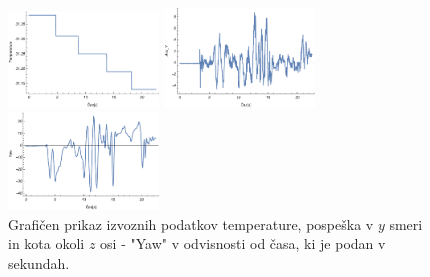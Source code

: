 \begin{figure}[!htbp]
	\begin{minipage}{3.5cm}
		\centering \includegraphics[width=4cm]{Vaje/ManevrZMems/figs/temp.pdf}
	\end{minipage}
	\hfill
	\begin{minipage}{3.5cm}
		\centering \includegraphics[width=4cm]{Vaje/ManevrZMems/figs/acc_y.pdf}
	\end{minipage}
	\hfill
	\begin{minipage}{3.5cm}
		\centering \includegraphics[width=4cm]{Vaje/ManevrZMems/figs/yaw.pdf}
	\end{minipage}
	\caption{Grafičen prikaz izvoznih podatkov temperature, pospeška v $y$ smeri in kota okoli $z$ osi - "Yaw" v odvisnosti od časa, ki je podan v sekundah.}
	\label{fig:v_mems_graf}
\end{figure}
